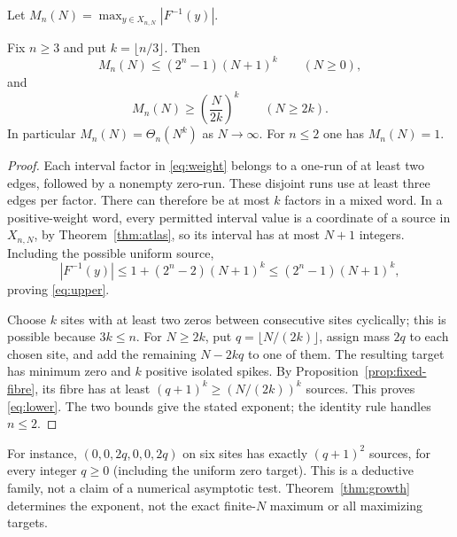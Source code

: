 Let $M_n(N)=\max_{y\in X_{n,N}}|F^{-1}(y)|$.
\begin{theorem}\label{thm:growth}
Fix $n\ge3$ and put $k=\lfloor n/3\rfloor$. Then
\begin{equation}\label{eq:upper}
 M_n(N)\le (2^n-1)(N+1)^k\qquad(N\ge0),
\end{equation}
and
\begin{equation}\label{eq:lower}
 M_n(N)\ge \left(\frac{N}{2k}\right)^k\qquad(N\ge2k).
\end{equation}
In particular $M_n(N)=\Theta_n(N^k)$ as $N\to\infty$.
For $n\le2$ one has $M_n(N)=1$.
\end{theorem}
\begin{proof}
Each interval factor in \eqref{eq:weight} belongs to a one-run of at
least two edges, followed by a nonempty zero-run. These disjoint runs
use at least three edges per factor. There can therefore be at most
$k$ factors in a mixed word. In a positive-weight word, every permitted
interval value is a coordinate of a source in $X_{n,N}$, by
Theorem~\ref{thm:atlas}, so its interval has at most $N+1$ integers.
Including the possible uniform source,
\[
 |F^{-1}(y)|\le 1+(2^n-2)(N+1)^k
              \le(2^n-1)(N+1)^k,
\]
proving \eqref{eq:upper}.

Choose $k$ sites with at least two zeros between consecutive sites
cyclically; this is possible because $3k\le n$. For $N\ge2k$, put
$q=\lfloor N/(2k)\rfloor$, assign mass $2q$ to each chosen site,
and add the remaining $N-2kq$ to one of them. The resulting target
has minimum zero and $k$ positive isolated spikes. By
Proposition~\ref{prop:fixed-fibre}, its fibre has at least
$(q+1)^k\ge(N/(2k))^k$ sources. This proves \eqref{eq:lower}.
The two bounds give the stated exponent; the identity rule handles
$n\le2$.
\end{proof}

For instance, $(0,0,2q,0,0,2q)$ on six sites has exactly $(q+1)^2$
sources, for every integer $q\ge0$ (including the uniform zero target).
This is a deductive family, not a claim of a numerical asymptotic test.
Theorem~\ref{thm:growth} determines the exponent, not the exact finite-$N$
maximum or all maximizing targets.

